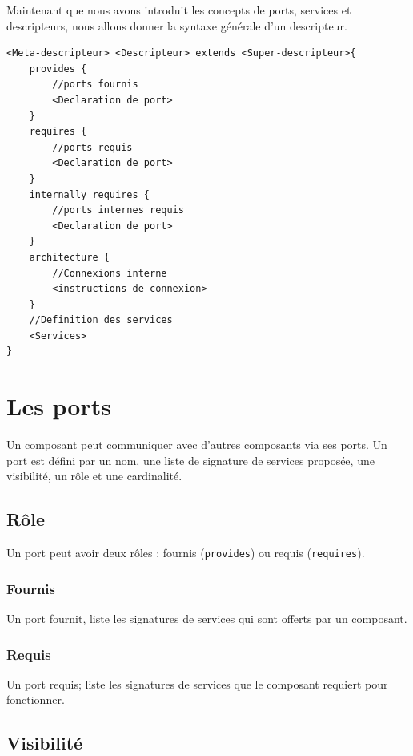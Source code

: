 \documentclass[11pt,a4paper,openany,oneside]{book}
\begin{document}
Maintenant que nous avons introduit les concepts de ports, services et descripteurs, nous allons donner la syntaxe générale d'un descripteur.
\begin{lstlisting}[language=Compo, frame=single, caption=Syntaxe générale d'un descripteur]
<Meta-descripteur> <Descripteur> extends <Super-descripteur>{
    provides {
        //ports fournis
        <Declaration de port>
    }
    requires {
        //ports requis
        <Declaration de port>
    }
    internally requires {
        //ports internes requis
        <Declaration de port>
    }
    architecture {
        //Connexions interne
        <instructions de connexion>
    }
    //Definition des services
    <Services>
}
\end{lstlisting}

\clearpage

\section{Les ports}

Un composant peut communiquer avec d'autres composants via ses ports. Un port est défini par un nom, une liste de signature de services proposée, une visibilité, un rôle et une cardinalité.

\subsection{Rôle}

Un port peut avoir deux rôles : fournis (\texttt{provides}) ou requis (\texttt{requires}).

\subsubsection{Fournis}

Un port fournit, liste les signatures de services qui sont offerts par un composant. 

\subsubsection{Requis}

Un port requis; liste les signatures de services que le composant requiert pour fonctionner.

\subsection{Visibilité}
\end{document}
